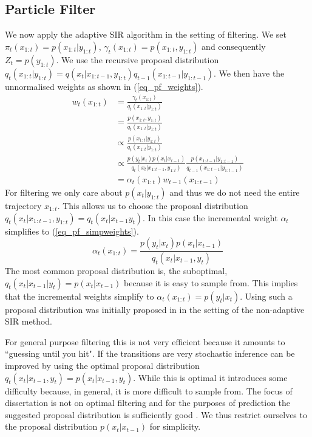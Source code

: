 \documentclass[../masters.tex]{subfiles}
\begin{document}
\subsection{Particle Filter}
We now apply the adaptive SIR algorithm in the setting of filtering. We set $\pi_t(x_{1:t}) = p(x_{1:t}|y_{1:t})$, $\gamma_t(x_{1:t}) = p(x_{1:t}, y_{1:t})$ and consequently $Z_t = p(y_{1:t})$. We use the recursive proposal distribution $q_t(x_{1:t}|y_{1:t}) = q(x_t|x_{1:t-1}, y_{1:t})q_{t-1}(x_{1:t-1}|y_{1:t-1})$. We then have the unnormalised weights as shown in (\ref{eq_pf_weights}).
\begin{equation}
\begin{aligned}
w_t(x_{1:t}) &= \frac{\gamma_t(x_{1:t})}{q_t(x_{1:t}|y_{1:t})} \\
&= \frac{p(x_{1:t}, y_{1:t})}{q_t(x_{1:t}|y_{1:t})} \\
&\propto \frac{p(x_{1:t}| y_{1:t})}{q_t(x_{1:t}|y_{1:t})} \\
&\propto \frac{p(y_t|x_t)p(x_t|x_{t-1})}{q_t(x_t|x_{1:t-1}, y_{1:t})}\frac{p(x_{1:t-1}| y_{1:t-1})}{q_{t-1}(x_{1:t-1}|y_{1:t-1})} \\
&= \alpha_t(x_{1:t})w_{t-1}(x_{1:t-1})
\end{aligned}
\label{eq_pf_weights}
\end{equation}
For filtering we only care about $p(x_t|y_{1:t})$ and thus we do not need the entire trajectory $x_{1:t}$. This allows us to choose the proposal distribution $q_t(x_t|x_{1:t-1}, y_{1:t}) = q_t(x_{t}|x_{t-1}y_{t})$. In this case the incremental weight $\alpha_t$ simplifies to (\ref{eq_pf_simpweights}).
\begin{equation}
\alpha_t(x_{1:t}) = \frac{p(y_t|x_t)p(x_t|x_{t-1})}{q_t(x_t|x_{t-1}, y_{t})} 
\label{eq_pf_simpweights}
\end{equation}
The most common proposal distribution is, the suboptimal, $q_t(x_t|x_{t-1}|y_t) = p(x_t|x_{t-1})$ because it is easy to sample from. This implies that the incremental weights simplify to $\alpha_t(x_{1:t}) = p(y_t|x_t)$. Using such a proposal distribution was initially proposed in \cite{gordon} in the setting of the non-adaptive SIR method. 

For general purpose filtering this is not very efficient because it amounts to ``guessing until you hit". If the transitions are very stochastic inference can be improved by using the optimal proposal distribution $q_t(x_t|x_{t-1}, y_t) = p(x_t|x_{t-1}, y_t)$. While this is optimal it introduces some difficulty because, in general, it is more difficult to sample from. The focus of dissertation is not on optimal filtering and for the purposes of prediction the suggested proposal distribution is sufficiently good \cite{murphy1}. We thus restrict ourselves to the proposal distribution $p(x_t|x_{t-1})$ for simplicity.
\end{document}
